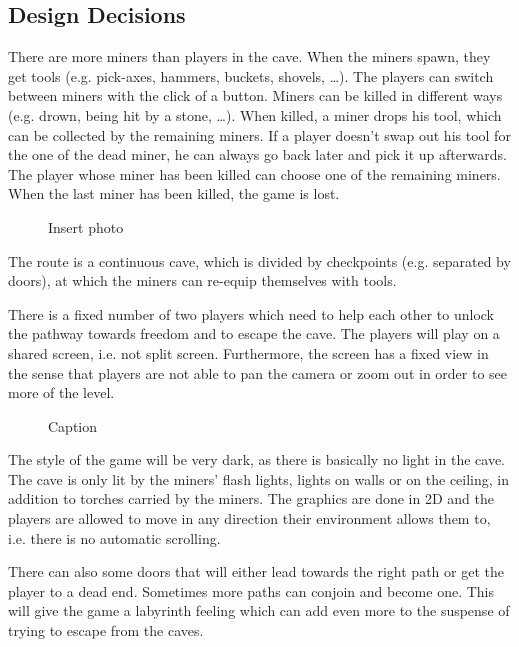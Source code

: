 \subsection{Design Decisions}

There are more miners than players in the cave. When the miners spawn, they get tools (e.g. pick-axes, hammers, buckets, shovels, …). The players can switch between miners with the click of a button. 
Miners can be killed in different ways (e.g. drown, being hit by a stone, …). When killed, a miner drops his tool, which can be collected by the remaining miners. If a player doesn't swap out his tool for the one of the dead miner, he can always go back later and pick it up afterwards. The player whose miner has been killed can choose one of the remaining miners. When the last miner has been killed, the game is lost.

\begin{figure}
    \centering
    \caption{Insert photo}
    \label{fig:my_label}
\end{figure}

The route is a continuous cave, which is divided by checkpoints (e.g. separated by doors), at which the miners can re-equip themselves with tools.

There is a fixed number of two players which need to help each other to unlock the pathway towards freedom and to escape the cave. The players will play on a shared screen, i.e. not split screen. Furthermore, the screen has a fixed view in the sense that players are not able to pan the camera or zoom out in order to see more of the level.


\begin{figure}
    \centering
    \caption{Caption}
    \label{fig:my_label}
\end{figure}


The style of the game will be very dark, as there is basically no light in the cave. The cave is only lit by the miners’ flash lights, lights on walls or on the ceiling, in addition to torches carried by the miners. The graphics are done in 2D and the players are allowed to move in any direction their environment allows them to, i.e. there is no automatic scrolling. 

There can also some doors that will either lead towards the right path or get the player to a dead end. Sometimes more paths can conjoin and become one. This will give the game a labyrinth feeling which can add even more to the suspense of trying to escape from the caves. 

